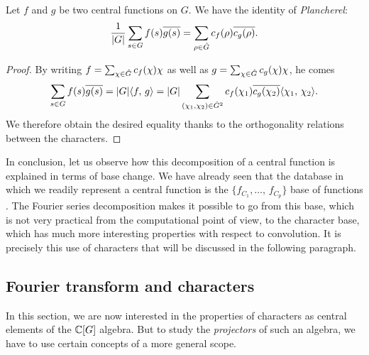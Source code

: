 
\begin{prop}
\label{prop-formula-floorel-representation}
 Let $ f $ and $ g $ be two central functions on $G$. We have the identity of \textit{Plancherel}:
\begin{equation*}
\frac{1}{|G|} \sum_{s \in G}{f(s) \overline{g (s)}} = \sum_{\rho \in \hat{G}}{c_{f } (\rho) \overline{c_{g} (\rho)}}.
\end{equation*}
\end{prop}
\begin{proof}
By writing $ f = \sum_{\chi \in \hat{G}}{c_{f} (\chi) \chi} $ as well as $ g = \sum_{\chi \in \hat{G}}{ c_{g} (\chi) \chi} $, he comes
\begin{equation*}
\sum_{s \in G}{f(s) \overline{g (s)}} = |G| \langle f,\,g\rangle = |G| \sum_{(\chi_1, \chi_2) \in \hat{G}^2}{c_{f} (\chi_1) \overline{c_{g} (\chi_2)} \langle \chi_1,\,\chi_2 \rangle}.
\end{equation*}
We therefore obtain the desired equality thanks to the orthogonality relations between the characters.
\end{proof}
 In conclusion, let us observe how this decomposition of a central function is explained in terms of base change. We have already seen that the  database in which we readily represent a central function is the $ \{f_{C_1}, \ldots, \, f_{C_p}\} $ base of  functions . The Fourier series decomposition makes it possible to go from this base, which is not very practical from the computational point of view, to the character base, which has much more interesting properties with respect to convolution. It is precisely this use of characters that will be discussed in the following paragraph.
\subsection{Fourier transform and characters}
\label{sect2-trans-fourier-et-caracteres}
 
 
  In this section, we are now interested in the properties of characters as central elements of the $ \mathbb{C} [G] $ algebra. But to study the \textit{projectors} of such an algebra, we have to use certain concepts of a more general scope.
 

